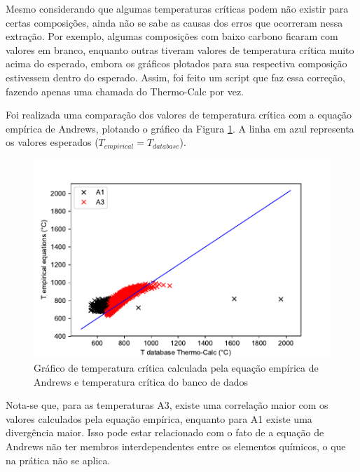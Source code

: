 \documentclass[brazil,tf,epusp]{usp}  %
\begin{document}
Mesmo considerando que algumas temperaturas críticas podem não existir para certas composições, ainda não se sabe as causas dos erros que ocorreram nessa extração. Por exemplo, algumas composições com baixo carbono ficaram com valores em branco, enquanto outras tiveram valores de temperatura crítica muito acima do esperado, embora os gráficos plotados para sua respectiva composição estivessem dentro do esperado. Assim, foi feito um script que faz essa correção, fazendo apenas uma chamada do Thermo-Calc\textregistered{} por vez.


Foi realizada uma comparação dos valores de temperatura crítica com a equação empírica de Andrews, plotando o gráfico da Figura \ref{fig:tcrit_andrews}. A linha em azul representa os valores esperados ($T_{empirical} = T_{database}$).

\begin{figure}
  \includegraphics[width=1.1\textwidth]{img/andrews.pdf}
  \caption{Gráfico de temperatura crítica calculada pela equação empírica de Andrews e temperatura crítica do banco de dados}
  \label{fig:tcrit_andrews}
\end{figure}

Nota-se que, para as temperaturas A3, existe uma correlação maior com os valores calculados pela equação empírica, enquanto para A1 existe uma divergência maior. Isso pode estar relacionado com o fato de a equação de Andrews não ter membros interdependentes entre os elementos químicos, o que na prática não se aplica.
\end{document}
